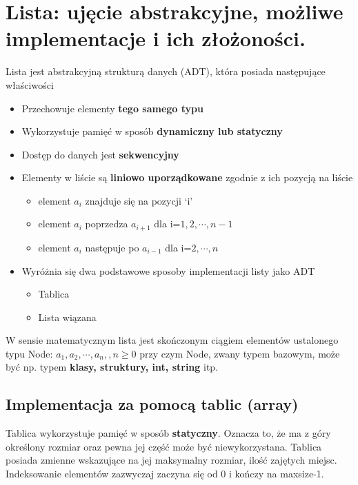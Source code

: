 \documentclass[main.tex]{subfiles}
\begin{document}
    \section{Lista: ujęcie abstrakcyjne, możliwe implementacje i ich złożoności.}
    \begin{definition}
        Lista jest abstrakcyjną strukturą danych (ADT), która posiada następujące właściwości
        \begin{itemize}
            \item Przechowuje elementy \textbf{tego samego typu}
            \item Wykorzystuje pamięć w sposób \textbf{dynamiczny lub statyczny}
            \item Dostęp do danych jest \textbf{sekwencyjny}
            \item Elementy w liście są \textbf{liniowo uporządkowane} zgodnie z ich pozycją na liście
            \begin{itemize}
                \item element $a_i$ znajduje się na pozycji ‘i’
                \item element $a_i$ poprzedza $a_{i+1}$ dla i=$1,2,\cdots,n-1$
                \item element $a_i$ następuje po $a_{i-1}$ dla i=$2,\cdots,n$
            \end{itemize}
            \item Wyróżnia się dwa podstawowe sposoby implementacji listy jako ADT
            \begin{itemize}
                \item Tablica
                \item Lista wiązana
            \end{itemize}
        \end{itemize}
    \end{definition}

    \begin{definition}
        W sensie matematycznym lista jest skończonym ciągiem elementów ustalonego typu
        Node: $a_1, a_2, \cdots , a_n, , n \geq 0$
        przy czym Node, zwany typem bazowym, może być np. typem \textbf{klasy, struktury, int,
        string} itp.
    \end{definition}

    \subsection{Implementacja za pomocą tablic (array)}
    Tablica wykorzystuje pamięć w sposób \textbf{statyczny}. Oznacza to, że ma z góry określony rozmiar oraz pewna jej część może być niewykorzystana. Tablica posiada zmienne wskazujące na jej maksymalny rozmiar, ilość zajętych miejsc. Indeksowanie elementów zazwyczaj zaczyna się od 0 i kończy na maxsize-1.
\end{document}
